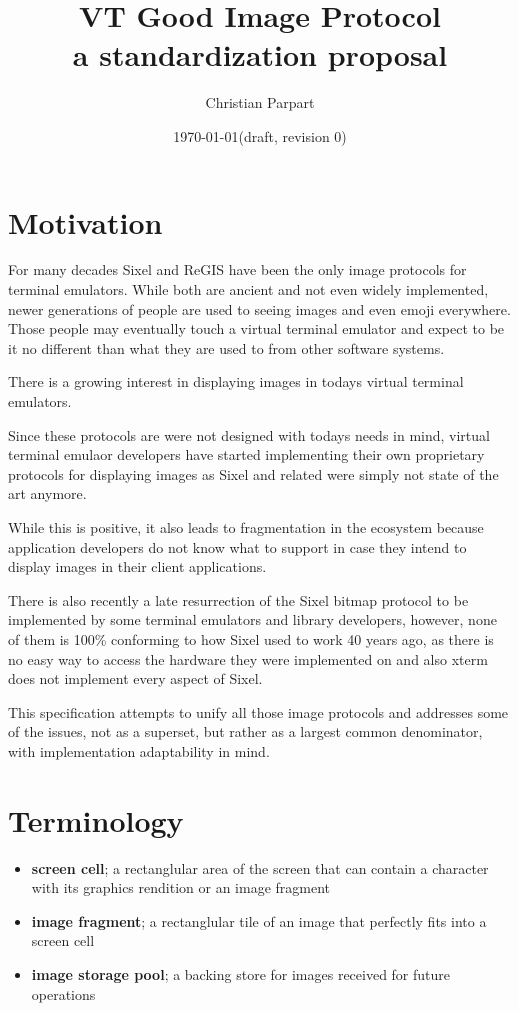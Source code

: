 \documentclass[a4paper]{article}
\title{VT Good Image Protocol \\
a standardization proposal}
\author{Christian Parpart}
\date{\today \quad (draft, revision 0)}
\begin{document}
\maketitle

\tableofcontents


\section{Motivation} %

For many decades Sixel and ReGIS have been the only image protocols for terminal emulators.
While both are ancient and not even widely implemented, newer generations of people are used
to seeing images and even emoji everywhere.
Those people may eventually touch a virtual terminal emulator and expect to be it no different
than what they are used to from other software systems.

There is a growing interest in displaying images in todays
virtual terminal emulators.

Since these protocols are were not designed with todays needs in mind,
virtual terminal emulaor developers have started implementing their own
proprietary protocols for displaying images as Sixel and related
were simply not state of the art anymore.

While this is positive, it also leads to fragmentation in the ecosystem
because application developers do not know what to support in case they intend
to display images in their client applications.

There is also recently a late resurrection of the Sixel bitmap protocol
to be implemented by some terminal emulators and library developers,
however, none of them is 100\% conforming to how Sixel used to work 40 years ago,
as there is no easy way to access the hardware they were implemented on
and also xterm does not implement every aspect of Sixel.

This specification attempts to unify all those image protocols and addresses
some of the issues, not as a superset, but rather as a largest common denominator,
with implementation adaptability in mind.
\section{Terminology} %
\begin{itemize}
    \item \textbf{screen cell}; a rectanglular area of the screen that can contain a character with
        its graphics rendition or an image fragment
    \item \textbf{image fragment}; a rectanglular tile of an image that perfectly fits into a screen cell
    \item \textbf{image storage pool}; a backing store for images received for future operations
\end{itemize}
\end{document}
